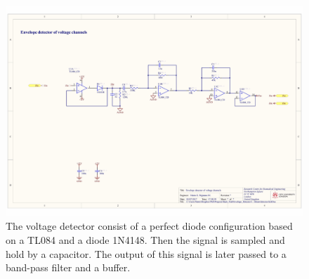 \begin{landscape}
	\begin{figure}[!htpb]
		\centering
		\includegraphics[width=0.95\paperwidth,keepaspectratio]{env_det_volt}
		\caption[Envelope detector of the voltage channels]{The voltage detector consist of a perfect diode configuration based on a TL084 and a diode 1N4148. Then the signal is sampled and hold by a capacitor. The output of this signal is later passed to a band-pass filter and a buffer.}
		\label{fig:envelope detector voltage}
	\end{figure}
\end{landscape}

